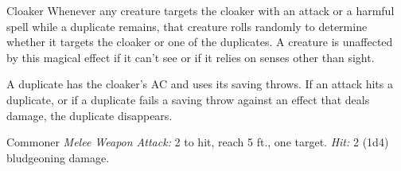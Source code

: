 \documentclass[10pt,a4paper,twoside,bg=print,twocolumn,openany,nodeprecatedcode]{dndbook}
\begin{document}
\begin{DndMonster}[float=t]{Cloaker}
Whenever any creature targets the cloaker with an attack or a harmful spell while a duplicate remains, that creature rolls randomly to determine whether it targets the cloaker or one of the duplicates. A creature is unaffected by this magical effect if it can't see or if it relies on senses other than sight.

A duplicate has the cloaker's AC and uses its saving throws. If an attack hits a duplicate, or if a duplicate fails a saving throw against an effect that deals damage, the duplicate disappears.

\end{DndMonster}



\begin{DndMonster}[float=t]{Commoner}
\DndMonsterBasics[
armor-class = {10},
hit-points = {\DndDice{1d8}},
speed = {30 ft.}
]
\DndMonsterAbilityScores[
 str = 10,
 dex = 10,
 con = 10,
 int = 10,
 wis = 10,
 cha = 10
]
\DndMonsterDetails[
languages = {any one language (usually Common)},
challenge = 0,
]
\textsl{Melee Weapon Attack:} 2 to hit, reach 5 ft., one target. \textsl{Hit:} 2 (1d4) bludgeoning damage.

\end{DndMonster}
\end{document}
